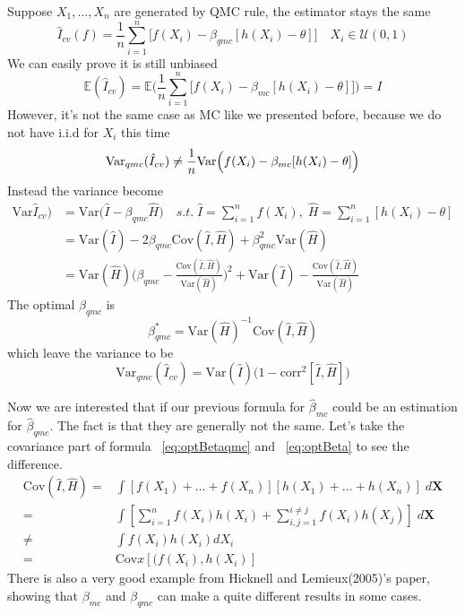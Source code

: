Suppose $X_1, \dots, X_n$ are generated by QMC rule, the estimator stays the same
\[
    \hat{I}_{cv}(f)=\frac{1}{n}\sum_{i=1}^{n}\Big[ f(X_i)-\beta_{qmc}[h(X_i)-\theta] \Big] \quad X_i\in \mathcal{U}(0,1)
\]
We can easily prove it is still unbiased
\[
\mathbb{E}(\hat{I}_{cv})=\mathbb{E}\Big(\frac{1}{n}\sum_{i=1}^{n}\Big[f(X_i)-\beta_{mc}[h(X_i)-\theta] \Big] \Big)=I 
\]
However, it's not the same case as MC like we presented before, because we do not have i.i.d for $X_i$ this time
\[
\mathrm{Var}_{qmc}(\hat{I}_{cv}) \not=\frac{1}{n}\mathrm{Var}\Big(f(X_i)-\beta_{mc}[h(X_i)-\theta]\Big)\\
\]
Instead the variance become
\begin{align*}
    \mathrm{Var}\hat{I}_{cv})  
    &=\mathrm{Var}\Big( \hat{I}- \beta_{qmc}\hat{H}\Big)
    \quad s.t.\; \hat{I}=\sum_{i=1}^{n}f(X_i),\; \hat{H}=\sum_{i=1}^{n}[h(X_i)-\theta]\\
    &=\mathrm{Var}(\hat{I})-2\beta_{qmc}\mathrm{Cov}(\hat{I},\hat{H})+\beta_{qmc}^2\mathrm{Var}(\hat{H})\\
    &=\mathrm{Var}(\hat{H})\Big(\beta_{qmc}-\frac{\mathrm{Cov}(\hat{I},\hat{H})}{\mathrm{Var}(\hat{H})}\Big)^2+\mathrm{Var}(\hat{I})-\frac{\mathrm{Cov}(\hat{I},\hat{H})}{\mathrm{Var}(\hat{H})}
\end{align*}
The optimal $\beta_{qmc}$ is
\begin{equation}
    \beta_{qmc}^*= \mathrm{Var} (\hat{H})^{-1}\mathrm{Cov} (\hat{I}, \hat{H})
    \label{eq:optBetaqmc}
\end{equation}
which leave the variance to be
\[
    \mathrm{Var}_{qmc}(\hat{I}_{cv})=\mathrm{Var}(\hat{I})\big(1-\mathrm{corr}^2[\hat{I}, \hat{H}]\big)
\]

Now we are interested that if our previous formula for $\hat{\beta}_{mc}$ could be an estimation for $\hat{\beta}_{qmc}$. The fact is that they are generally not the same. Let's take the covariance part of formula ~\eqref{eq:optBetaqmc} and ~\eqref{eq:optBeta} to see the difference. 
\begin{align*}
    \mathrm{Cov}(\hat{I}, \hat{H})=&\int [f(X_1)+\dots+f(X_n)][h(X_1)+\dots+h(X_n)]\; d\mathbf{X}\\
    =&\int [\sum_{i=1}^{n}f(X_i)h(X_i) + \sum_{i,j=1}^{i\neq j}f(X_i)h(X_j)]\; d\mathbf{X}\\
    \neq&\int f(X_i)h(X_i)dX_i\\
    =&\mathrm{Cov}x[(f(X_i),h(X_i)]
\end{align*}
There is also a very good example from Hicknell and Lemieux(2005)\cite{hickernell2005control}'s paper, showing that $\beta_{mc}$ and $\beta_{qmc}$ can make a quite different results in some cases. 


